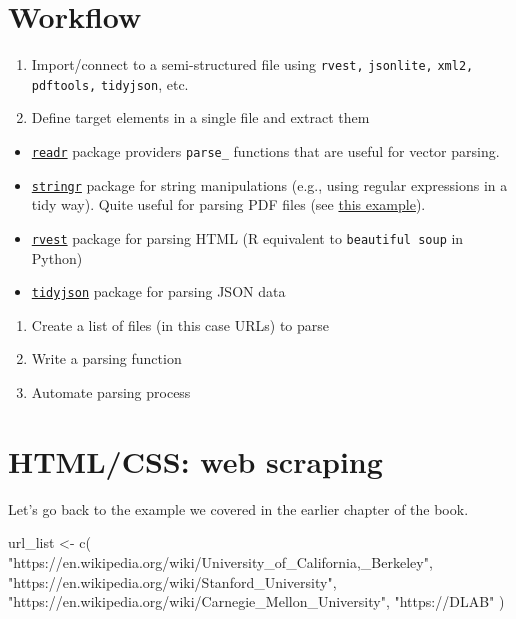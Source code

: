 \documentclass[
]{book}
\newenvironment{Shaded}{\begin{snugshade}}{\end{snugshade}}
\newcommand{\FunctionTok}[1]{\textcolor[rgb]{0.00,0.00,0.00}{#1}}
\newcommand{\NormalTok}[1]{#1}
\newcommand{\OtherTok}[1]{\textcolor[rgb]{0.56,0.35,0.01}{#1}}
\newcommand{\StringTok}[1]{\textcolor[rgb]{0.31,0.60,0.02}{#1}}
\begin{document}
\hypertarget{workflow-2}{%
\section{Workflow}\label{workflow-2}}

\begin{enumerate}
\def\labelenumi{\arabic{enumi}.}
\item
  Import/connect to a semi-structured file using \texttt{rvest,} \texttt{jsonlite,} \texttt{xml2,} \texttt{pdftools,} \texttt{tidyjson}, etc.
\item
  Define target elements in a single file and extract them
\end{enumerate}

\begin{itemize}
\item
  \href{https://readr.tidyverse.org/}{\texttt{readr}} package providers \texttt{parse\_} functions that are useful for vector parsing.
\item
  \href{https://stringr.tidyverse.org/}{\texttt{stringr}} package for string manipulations (e.g., using regular expressions in a tidy way). Quite useful for parsing PDF files (see \href{https://themockup.blog/posts/2020-04-03-beer-and-pdftools-a-vignette/}{this example}).
\item
  \href{https://github.com/tidyverse/rvest}{\texttt{rvest}} package for parsing HTML (R equivalent to \texttt{beautiful\ soup} in Python)
\item
  \href{https://github.com/sailthru/tidyjson}{\texttt{tidyjson}} package for parsing JSON data
\end{itemize}

\begin{enumerate}
\def\labelenumi{\arabic{enumi}.}
\setcounter{enumi}{2}
\item
  Create a list of files (in this case URLs) to parse
\item
  Write a parsing function
\item
  Automate parsing process
\end{enumerate}

\hypertarget{htmlcss-web-scraping}{%
\section{HTML/CSS: web scraping}\label{htmlcss-web-scraping}}

Let's go back to the example we covered in the earlier chapter of the book.

\begin{Shaded}
\begin{Highlighting}[]
\NormalTok{url\_list }\OtherTok{\textless{}{-}} \FunctionTok{c}\NormalTok{(}
  \StringTok{"https://en.wikipedia.org/wiki/University\_of\_California,\_Berkeley"}\NormalTok{,}
  \StringTok{"https://en.wikipedia.org/wiki/Stanford\_University"}\NormalTok{,}
  \StringTok{"https://en.wikipedia.org/wiki/Carnegie\_Mellon\_University"}\NormalTok{,}
  \StringTok{"https://DLAB"}
\NormalTok{)}
\end{Highlighting}
\end{Shaded}
\end{document}
